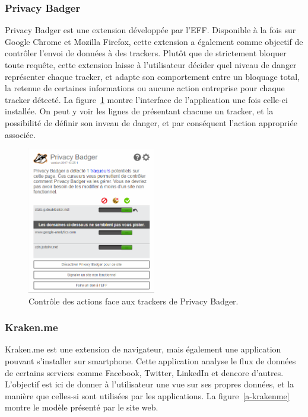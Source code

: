 		\subsubsection{Privacy Badger}

			Privacy Badger est une extension développée par l'EFF\cite{eff}. Disponible à la fois sur Google Chrome et Mozilla Firefox, cette extension a également comme objectif de contrôler l'envoi de données à des trackers.
			Plutôt que de strictement bloquer toute requête, cette extension laisse à l'utilisateur décider quel niveau de danger représenter chaque tracker, et adapte son comportement entre un bloquage total, la retenue de certaines informations ou aucune action entreprise pour chaque tracker détecté.
			La figure~\ref{a-privacybadger} montre l'interface de l'application une fois celle-ci installée. On peut y voir les lignes de présentant chacune un tracker, et la possibilité de définir son inveau de danger, et par conséquent l'action appropriée associée.

			\begin{figure}[h]
				\centering
				\includegraphics[width=0.5\textwidth]{images/analysis/privacybadger}
				\caption{Contrôle des actions face aux trackers de Privacy Badger\cite{privacybadger}.}
				\label{a-privacybadger}
			\end{figure}

		\subsubsection{Kraken.me}

			Kraken.me est une extension de navigateur, mais également une application pouvant s'installer sur smartphone. Cette application analyse le flux de données de certains services comme Facebook, Twitter, LinkedIn et dencore d'autres. L'objectif est ici de donner à l'utilisateur une vue sur ses propres données, et la manière que celles-si sont utilisées par les applications.
			La figure~\ref{a-krakenme} montre le modèle présenté par le site web.

